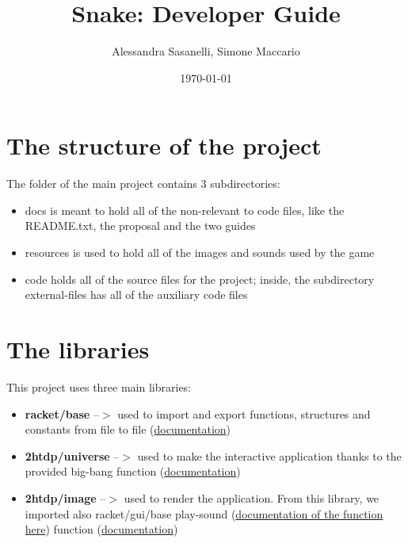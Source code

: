 \documentclass{article}
\title{Snake: Developer Guide}
\author{Alessandra Sasanelli, Simone Maccario}
\date{\today}
\begin{document}
	\maketitle
	
	\section{The structure of the project}
	The folder of the main project contains 3 subdirectories: 
	\begin{itemize}
		\item docs is meant to hold all of the non-relevant to code files, like the README.txt, the proposal and the two guides
		\item resources is used to hold all of the images and sounds used by the game
		\item code holds all of the source files for the project; inside, the subdirectory external-files has all of the auxiliary code files
	\end{itemize}
	
	\section{The libraries}	
	This project uses three main libraries:
	\begin{itemize}
		\item \textbf{racket/base} --$>$ used to import and export functions, structures and constants from file to file 
		(\href{https://docs.racket-lang.org/reference/index.html}{documentation})
		\item \textbf{2htdp/universe} --$>$ used to make the interactive application thanks to the provided big-bang function 
		(\href{https://docs.racket-lang.org/teachpack/2htdpuniverse.html}{documentation})
		\item \textbf{2htdp/image} --$>$ used to render the application. From this library, we imported also racket/gui/base play-sound (\href{https://docs.racket-lang.org/gui/Windowing_Functions.html#\%28def._\%28\%28lib._mred\%2Fmain..rkt\%29._play-sound\%29\%29}{documentation of the function here}) function 	
		(\href{https://docs.racket-lang.org/teachpack/2htdpimage.html}{documentation})
	\end{itemize}
	
\end{document}
